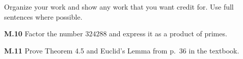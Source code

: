 \documentclass[addpoints]{exam}
\begin{document}
Organize your work and show any work that you want credit for. Use full sentences where possible.

\begin{questions}

\question \textbf{M.10}
Factor the number $324288$ and express it as a product of primes.

\question \textbf{M.11}
Prove Theorem 4.5 and Euclid's Lemma from p.\ 36 in the textbook.




\end{questions}
\end{document}
